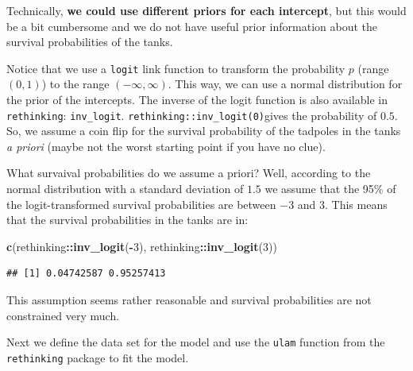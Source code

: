\documentclass[
]{book}
\newenvironment{Shaded}{\begin{snugshade}}{\end{snugshade}}
\newcommand{\DecValTok}[1]{\textcolor[rgb]{0.00,0.00,0.81}{#1}}
\newcommand{\FunctionTok}[1]{\textcolor[rgb]{0.13,0.29,0.53}{\textbf{#1}}}
\newcommand{\NormalTok}[1]{#1}
\newcommand{\SpecialCharTok}[1]{\textcolor[rgb]{0.81,0.36,0.00}{\textbf{#1}}}
\begin{document}
Technically, \textbf{we could use different priors for each intercept},
but this would be a bit cumbersome and we do not have useful prior information
about the survival probabilities of the tanks.

Notice that we use a \texttt{logit} link function to transform the probability \(p\) (range \((0,1)\))
to the range \((-\infty, \infty)\).
This way, we can use a normal distribution for the prior of the intercepts.
The inverse of the logit function is also available in \texttt{rethinking}: \texttt{inv\_logit}.
\texttt{rethinking::inv\_logit(0)}gives the probability of \(0.5\). So, we assume a coin flip for
the survival probability of the tadpoles in the tanks \emph{a priori}
(maybe not the worst starting point if you have no clue).

What survaival probabilities do we assume a priori? Well, according to
the normal distribution with a standard deviation of \(1.5\) we assume that the
95\% of the logit-transformed survival probabilities are between \(-3\) and \(3\).
This means that the survival probabilities in the tanks are in:

\begin{Shaded}
\begin{Highlighting}[]
\FunctionTok{c}\NormalTok{(rethinking}\SpecialCharTok{::}\FunctionTok{inv\_logit}\NormalTok{(}\SpecialCharTok{{-}}\DecValTok{3}\NormalTok{), rethinking}\SpecialCharTok{::}\FunctionTok{inv\_logit}\NormalTok{(}\DecValTok{3}\NormalTok{))}
\end{Highlighting}
\end{Shaded}

\begin{verbatim}
## [1] 0.04742587 0.95257413
\end{verbatim}

This assumption seems rather reasonable and survival probabilities are not constrained very much.

Next we define the data set for the model and use the \texttt{ulam} function
from the \texttt{rethinking} package to fit the model.
\end{document}
